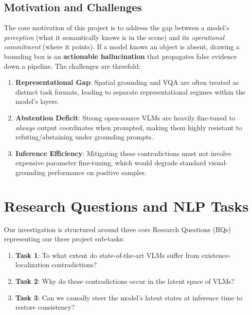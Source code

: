 \documentclass[12pt,a4paper]{article}
\begin{document}
\subsection{Motivation and Challenges}

The core motivation of this project is to address the gap between a model's \textit{perception} (what it semantically knows is in the scene) and its \textit{operational commitment} (where it points). If a model knows an object is absent, drawing a bounding box is an \textbf{actionable hallucination} that propagates false evidence down a pipeline. The challenges are threefold:

\begin{enumerate}[leftmargin=*]
\item \textbf{Representational Gap}: Spatial grounding and VQA are often treated as distinct task formats, leading to separate representational regimes within the model's layers.
\item \textbf{Abstention Deficit}: Strong open-source VLMs are heavily fine-tuned to \textit{always} output coordinates when prompted, making them highly resistant to refuting/abstaining under grounding prompts.
\item \textbf{Inference Efficiency}: Mitigating these contradictions must not involve expensive parameter fine-tuning, which would degrade standard visual-grounding performance on positive samples.
\end{enumerate}

\section{Research Questions and NLP Tasks}

Our investigation is structured around three core Research Questions (RQs) representing our three project sub-tasks:

\begin{enumerate}[leftmargin=*]
\item \textbf{Task 1}: To what extent do state-of-the-art VLMs suffer from existence-localization contradictions?
\item \textbf{Task 2}: Why do these contradictions occur in the latent space of VLMs?
\item \textbf{Task 3}: Can we causally steer the model's latent states at inference time to restore consistency?
\end{enumerate}
\end{document}
